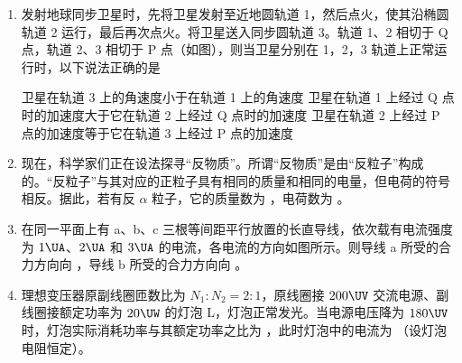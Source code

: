 \documentclass[\gkver]{gaokaozhenti}
\begin{document}
\begin{enumerate}
\item
发射地球同步卫星时，先将卫星发射至近地圆轨道 1，然后点火，使其沿椭圆轨道 2 运行，最后再次点火。将卫星送入同步圆轨道 3。轨道 1、2 相切于 Q 点，轨道 2、3 相切于 P 点（如图），则当卫星分别在 1，2，3 轨道上正常运行时，以下说法正确的是

\onepicture[h=3.86cm]{}

{卫星在轨道 3 上的角速度小于在轨道 1 上的角速度}
{卫星在轨道 1 上经过 Q 点时的加速度大于它在轨道 2 上经过 Q 点时的加速度}
{卫星在轨道 2 上经过 P 点的加速度等于它在轨道 3 上经过 P 点的加速度}


\item
现在，科学家们正在设法探寻“反物质”。所谓“反物质”是由“反粒子”构成的。“反粒子”与其对应的正粒子具有相同的质量和相同的电量，但电荷的符号相反。据此，若有反 $\alpha$ 粒子，它的质量数为 ，电荷数为 。


\item
在同一平面上有 a、b、c 三根等间距平行放置的长直导线，依次载有电流强度为 $1\UA$、$2\UA$ 和 $3\UA$ 的电流，各电流的方向如图所示。则导线 a 所受的合力方向向 ，导线 b 所受的合力方向向 。

\onepicture[align=right, h=4.00cm]{}


\item
理想变压器原副线圈匝数比为 $N_{1}:N_{2} = 2:1$，原线圈接 $200\UV$ 交流电源、副线圈接额定功率为 $20\UW$ 的灯泡 L，灯泡正常发光。当电源电压降为 $180\UV$ 时，灯泡实际消耗功率与其额定功率之比为 ，此时灯泡中的电流为 \tkanswer[1.6cm]{$0.18\UA$}（设灯泡电阻恒定）。


\end{enumerate}
\end{document}
